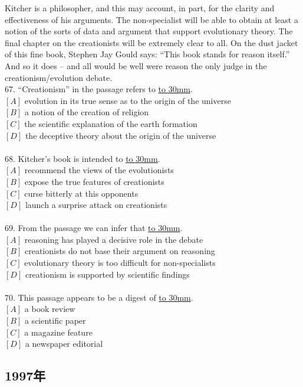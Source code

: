 \documentclass[a4paper]{article}
\begin{document}
\par
Kitcher is a philosopher, and this may account, in part, for the clarity and effectiveness of his arguments. The non-specialist will be able to obtain at least a notion of the sorts of data and argument that support evolutionary theory. The final chapter on the creationists will be extremely clear to all. On the dust jacket of this fine book, Stephen Jay Gould says: “This book stands for reason itself.” And so it does -- and all would be well were reason the only judge in the creationism/evolution debate.
\\67.	“Creationism” in the passage refers to \underline{\hbox to 30mm{}}.\\$[A]$ evolution in its true sense as to the origin of the universe\\$[B]$ a notion of the creation of religion\\$[C]$ the scientific explanation of the earth formation\\$[D]$ the deceptive theory about the origin of the universe\\\\68.	Kitcher’s book is intended to \underline{\hbox to 30mm{}}.\\$[A]$ recommend the views of the evolutionists\\$[B]$ expose the true features of creationists\\$[C]$ curse bitterly at this opponents\\$[D]$ launch a surprise attack on creationists\\\\69.	From the passage we can infer that \underline{\hbox to 30mm{}}.\\$[A]$ reasoning has played a decisive role in the debate\\$[B]$ creationists do not base their argument on reasoning\\$[C]$ evolutionary theory is too difficult for non-specialists\\$[D]$ creationism is supported by scientific findings\\\\70.	This passage appears to be a digest of \underline{\hbox to 30mm{}}.\\$[A]$ a book review\\$[B]$ a scientific paper\\$[C]$ a magazine feature\\$[D]$ a newspaper editorial\\\subsection{1997年}
\end{document}
